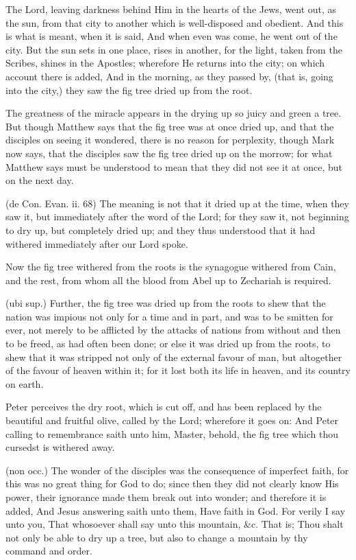  The Lord, leaving darkness behind Him in the hearts of the Jews, went out, as the sun, from that city to another which is well-disposed and obedient. And this is what is meant, when it is said, And when even was come, he went out of the city. But the sun sets in one place, rises in another, for the light, taken from the Scribes, shines in the Apostles; wherefore He returns into the city; on which account there is added, And in the morning, as they passed by, (that is, going into the city,) they saw the fig tree dried up from the root.

 The greatness of the miracle appears in the drying up so juicy and green a tree. But though Matthew says that the fig tree was at once dried up, and that the disciples on seeing it wondered, there is no reason for perplexity, though Mark now says, that the disciples saw the fig tree dried up on the morrow; for what Matthew says must be understood to mean that they did not see it at once, but on the next day.

 (de Con. Evan. ii. 68) The meaning is not that it dried up at the time, when they saw it, but immediately after the word of the Lord; for they saw it, not beginning to dry up, but completely dried up; and they thus understood that it had withered immediately after our Lord spoke.

 Now the fig tree withered from the roots is the synagogue withered from Cain, and the rest, from whom all the blood from Abel up to Zechariah is required.

 (ubi sup.) Further, the fig tree was dried up from the roots to shew that the nation was impious not only for a time and in part, and was to be smitten for ever, not merely to be afflicted by the attacks of nations from without and then to be freed, as had often been done; or else it was dried up from the roots, to shew that it was stripped not only of the external favour of man, but altogether of the favour of heaven within it; for it lost both its life in heaven, and its country on earth.

 Peter perceives the dry root, which is cut off, and has been replaced by the beautiful and fruitful olive, called by the Lord; wherefore it goes on: And Peter calling to remembrance saith unto him, Master, behold, the fig tree which thou cursedst is withered away.

 (non occ.) The wonder of the disciples was the consequence of imperfect faith, for this was no great thing for God to do; since then they did not clearly know His power, their ignorance made them break out into wonder; and therefore it is added, And Jesus answering saith unto them, Have faith in God. For verily I say unto you, That whosoever shall say unto this mountain, \&c. That is; Thou shalt not only be able to dry up a tree, but also to change a mountain by thy command and order.

